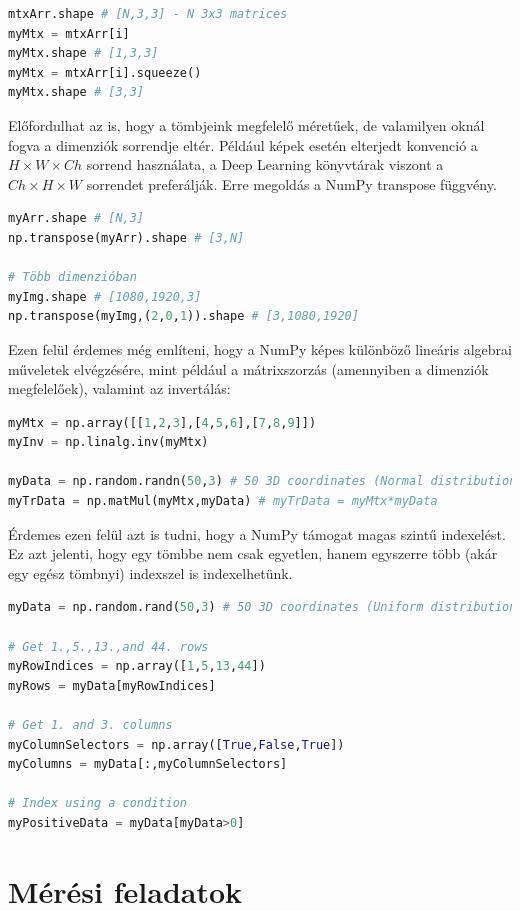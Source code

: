 \documentclass[12pt,a4paper,oneside]{report}             %
\begin{document}
\begin{lstlisting}[language=Python]
mtxArr.shape # [N,3,3] - N 3x3 matrices
myMtx = mtxArr[i]
myMtx.shape # [1,3,3]
myMtx = mtxArr[i].squeeze()
myMtx.shape # [3,3]
\end{lstlisting}

Előfordulhat az is, hogy a tömbjeink megfelelő méretűek, de valamilyen oknál fogva a dimenziók sorrendje eltér. Például képek esetén elterjedt konvenció a $H\times W\times Ch$ sorrend használata, a Deep Learning könyvtárak viszont a $Ch\times H\times W$ sorrendet preferálják. Erre megoldás a NumPy transpose függvény.

\begin{lstlisting}[language=Python]
myArr.shape # [N,3]
np.transpose(myArr).shape # [3,N]

# Több dimenzióban
myImg.shape # [1080,1920,3]
np.transpose(myImg,(2,0,1)).shape # [3,1080,1920]
\end{lstlisting}

Ezen felül érdemes még említeni, hogy a NumPy képes különböző lineáris algebrai műveletek elvégzésére, mint például a mátrixszorzás (amennyiben a dimenziók megfelelőek), valamint az invertálás:

\begin{lstlisting}[language=Python]
myMtx = np.array([[1,2,3],[4,5,6],[7,8,9]])
myInv = np.linalg.inv(myMtx)

myData = np.random.randn(50,3) # 50 3D coordinates (Normal distribution)
myTrData = np.matMul(myMtx,myData) # myTrData = myMtx*myData
\end{lstlisting}

Érdemes ezen felül azt is tudni, hogy a NumPy támogat magas szintű indexelést. Ez azt jelenti, hogy egy tömbbe nem csak egyetlen, hanem egyszerre több (akár egy egész tömbnyi) indexszel is indexelhetünk.

\begin{lstlisting}[language=Python]
myData = np.random.rand(50,3) # 50 3D coordinates (Uniform distribution)

# Get 1.,5.,13.,and 44. rows
myRowIndices = np.array([1,5,13,44])
myRows = myData[myRowIndices]

# Get 1. and 3. columns
myColumnSelectors = np.array([True,False,True])
myColumns = myData[:,myColumnSelectors]

# Index using a condition
myPositiveData = myData[myData>0]
\end{lstlisting}

\chapter{Mérési feladatok}
\end{document}
